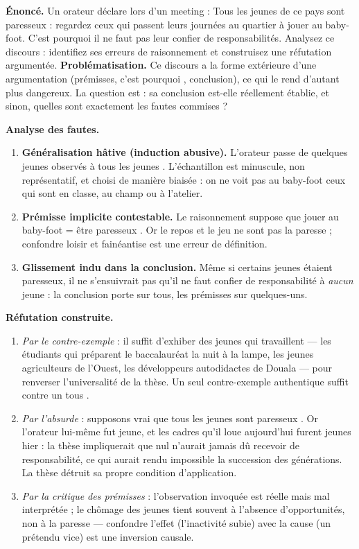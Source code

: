 \documentclass[11pt]{article}
\begin{document}
\begin{exoresolu}
\textbf{Énoncé.} Un orateur déclare lors d'un meeting : \guillemotleft Tous les jeunes de ce pays sont paresseux : regardez ceux qui passent leurs journées au quartier à jouer au baby-foot. C'est pourquoi il ne faut pas leur confier de responsabilités. \guillemotright Analysez ce discours : identifiez ses erreurs de raisonnement et construisez une réfutation argumentée.
\tcblower
\textbf{Problématisation.} Ce discours a la forme extérieure d'une argumentation (prémisses, \guillemotleft c'est pourquoi \guillemotright, conclusion), ce qui le rend d'autant plus dangereux. La question est : sa conclusion est-elle réellement établie, et sinon, quelles sont exactement les fautes commises ?

\textbf{Analyse des fautes.}
\begin{enumerate}
\item \textbf{Généralisation hâtive (induction abusive).} L'orateur passe de quelques jeunes observés à \guillemotleft tous les jeunes \guillemotright. L'échantillon est minuscule, non représentatif, et choisi de manière biaisée : on ne voit pas au baby-foot ceux qui sont en classe, au champ ou à l'atelier.
\item \textbf{Prémisse implicite contestable.} Le raisonnement suppose que \guillemotleft jouer au baby-foot = être paresseux \guillemotright. Or le repos et le jeu ne sont pas la paresse ; confondre loisir et fainéantise est une erreur de définition.
\item \textbf{Glissement indu dans la conclusion.} Même si certains jeunes étaient paresseux, il ne s'ensuivrait pas qu'il ne faut confier de responsabilité à \emph{aucun} jeune : la conclusion porte sur tous, les prémisses sur quelques-uns.
\end{enumerate}

\textbf{Réfutation construite.}
\begin{enumerate}
\item \emph{Par le contre-exemple} : il suffit d'exhiber des jeunes qui travaillent — les étudiants qui préparent le baccalauréat la nuit à la lampe, les jeunes agriculteurs de l'Ouest, les développeurs autodidactes de Douala — pour renverser l'universalité de la thèse. Un seul contre-exemple authentique suffit contre un \guillemotleft tous \guillemotright.
\item \emph{Par l'absurde} : supposons vrai que \guillemotleft tous les jeunes sont paresseux \guillemotright. Or l'orateur lui-même fut jeune, et les cadres qu'il loue aujourd'hui furent jeunes hier : la thèse impliquerait que nul n'aurait jamais dû recevoir de responsabilité, ce qui aurait rendu impossible la succession des générations. La thèse détruit sa propre condition d'application.
\item \emph{Par la critique des prémisses} : l'observation invoquée est réelle mais mal interprétée ; le chômage des jeunes tient souvent à l'absence d'opportunités, non à la paresse — confondre l'effet (l'inactivité subie) avec la cause (un prétendu vice) est une inversion causale.
\end{enumerate}


\end{exoresolu}
\end{document}
